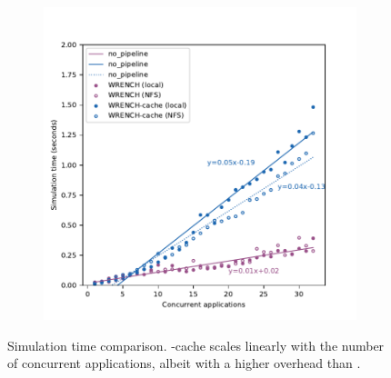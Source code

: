\begin{figure}[!h]
    \begin{subfigure}{\columnwidth}
        \centering
        \includegraphics[width=\linewidth]{result/multi/figures/simulation_time.pdf}
    \end{subfigure}
    \caption{Simulation time comparison. \wrench-cache scales
    linearly with the number of concurrent applications, albeit
    with a higher overhead than \wrench.}
    \label{fig:multi_time}
\end{figure}